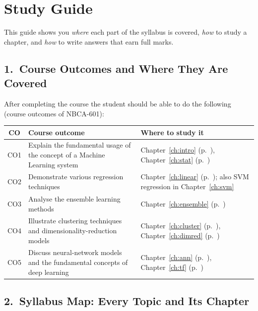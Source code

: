 \chapter*{Study Guide}

This guide shows you \emph{where} each part of the syllabus is covered, \emph{how} to study a chapter, and \emph{how} to write answers that earn full marks.

\section*{1.\ Course Outcomes and Where They Are Covered}

After completing the course the student should be able to do the following (course outcomes of NBCA-601):

\begin{center}
\small
\begin{tabular}{@{}cp{7.6cm}p{4.6cm}@{}}
\toprule
\textbf{CO} & \textbf{Course outcome} & \textbf{Where to study it}\\
\midrule
CO1 & Explain the fundamental usage of the concept of a Machine Learning system & Chapter~\ref{ch:intro} (p.~\pageref{ch:intro}), Chapter~\ref{ch:stat} (p.~\pageref{ch:stat})\\
CO2 & Demonstrate various regression techniques & Chapter~\ref{ch:linear} (p.~\pageref{ch:linear}); also SVM regression in Chapter~\ref{ch:svm}\\
CO3 & Analyse the ensemble learning methods & Chapter~\ref{ch:ensemble} (p.~\pageref{ch:ensemble})\\
CO4 & Illustrate clustering techniques and dimensionality-reduction models & Chapter~\ref{ch:cluster} (p.~\pageref{ch:cluster}), Chapter~\ref{ch:dimred} (p.~\pageref{ch:dimred})\\
CO5 & Discuss neural-network models and the fundamental concepts of deep learning & Chapter~\ref{ch:ann} (p.~\pageref{ch:ann}), Chapter~\ref{ch:tf} (p.~\pageref{ch:tf})\\
\bottomrule
\end{tabular}
\end{center}

\section*{2.\ Syllabus Map: Every Topic and Its Chapter}

